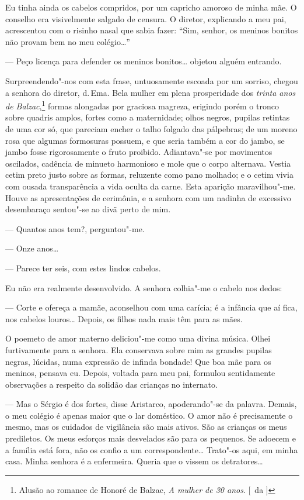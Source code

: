 Eu tinha ainda os cabelos compridos, por um capricho amoroso de minha mãe. O
conselho era visivelmente salgado de censura. O diretor, explicando a
meu pai, acrescentou com o risinho nasal que sabia fazer: ``Sim, senhor,
os meninos bonitos não provam bem no meu colégio\ldots{}'' 

--- Peço licença para defender os meninos bonitos\ldots{} objetou alguém entrando.

Surpreendendo"-nos com esta frase, untuosamente escoada por um
sorriso, chegou a senhora do diretor, d.\,Ema. Bela mulher em plena
prosperidade dos \textit{trinta anos de Balzac},\footnote{ Alusão ao romance de Honoré de Balzac, 
\textit{A mulher de 30 anos}. [~da ]} 
formas alongadas por graciosa magreza, erigindo porém o tronco sobre
quadris amplos, fortes como a maternidade; olhos negros, pupilas
retintas de uma cor só, que pareciam encher o talho folgado das
pálpebras; de um moreno rosa que algumas formosuras possuem, e que
seria também a cor do jambo, se jambo fosse rigorosamente o fruto
proibido. Adiantava"-se por movimentos oscilados, cadência de minueto
harmonioso e mole que o corpo alternava. Vestia cetim preto justo sobre
as formas, reluzente como pano molhado; e o cetim vivia com ousada
transparência a vida oculta da carne. Esta aparição maravilhou"-me.
Houve as apresentações de cerimônia, e a senhora com um nadinha de
excessivo desembaraço sentou"-se ao divã perto de mim. 

--- Quantos anos tem?, perguntou"-me. 

--- Onze anos\ldots{} 

--- Parece ter seis, com estes lindos cabelos. 

Eu não era realmente desenvolvido. A senhora
colhia"-me o cabelo nos dedos: 

--- Corte e ofereça a mamãe, aconselhou
com uma carícia; é a infância que aí fica, nos cabelos louros\ldots{}
Depois, os filhos nada mais têm para as mães. 

O poemeto de amor materno deliciou"-me como uma divina música. Olhei furtivamente 
para a senhora. Ela conservava sobre mim as grandes pupilas negras, lúcidas,
numa expressão de infinda bondade! Que boa mãe para os meninos, pensava
eu. Depois, voltada para meu pai, formulou sentidamente observações a
respeito da solidão das crianças no internato. 

--- Mas o Sérgio é dos fortes, disse Aristarco, apoderando"-se da palavra. 
Demais, o meu colégio é apenas maior que o lar doméstico. O amor não é precisamente o
mesmo, mas os cuidados de vigilância são mais ativos. São as crianças
os meus prediletos. Os meus esforços mais desvelados são para os
pequenos. Se adoecem e a família está fora, não os confio a um
correspondente\ldots{} Trato"-os aqui, em minha casa. Minha senhora é a
enfermeira. Queria que o vissem os detratores\ldots{} 

